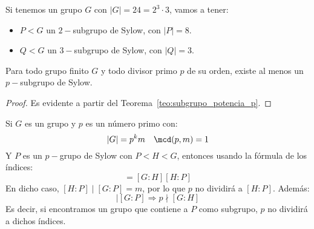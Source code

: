 \begin{ejemplo}
    Si tenemos un grupo $G$ con $|G| = 24 = 2^3 \cdot 3$, vamos a tener:
    \begin{itemize}
        \item $P<G$ un $2-$subgrupo de Sylow, con $|P| = 8$.
        \item $Q<G$ un $3-$subgrupo de Sylow, con $|Q| = 3$.
    \end{itemize}
\end{ejemplo}

\begin{coro}
    Para todo grupo finito $G$ y todo divisor primo $p$ de su orden, existe al menos un $p-$subgrupo de Sylow.
    \begin{proof}
        Es evidente a partir del Teorema~\ref{teo:subgrupo_potencia_p}.
    \end{proof}
\end{coro}

\begin{observacion}
    Si $G$ es un grupo y $p$ es un número primo con:
    \begin{equation*}
        |G| = p^k m \quad \mcd(p,m) = 1
    \end{equation*}
    Y $P$ es un $p-$grupo de Sylow con $P<H<G$, entonces usando la fórmula de los índices:
    \begin{equation*}
        [G:P] = [G:H][H:P]
    \end{equation*}
    En dicho caso, $[H:P] \mid [G:P] = m$, por lo que $p$ no dividirá a $[H:P]$. Además:
    \begin{equation*}
        [G:H] \mid [G:P] \Longrightarrow p\nmid [G:H]
    \end{equation*}
    Es decir, si encontramos un grupo que contiene a $P$ como subgrupo, $p$ no dividirá a dichos índices.
\end{observacion}

